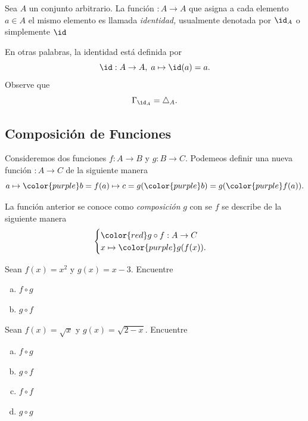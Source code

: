 	\begin{problema}
		Sea $A$ un conjunto arbitrario. La función $:A \to A$ que asigna a cada elemento $a\in A$ el mismo elemento es llamada \emph{identidad,} usualmente denotada por $\id_{A}$ o simplemente $\id$
		
		
		En otras palabras, la identidad está definida por $$
		\id:A\to A, \; a \mapsto \id(a)=a.
		$$ Observe que
		$$
		\Gamma_{\id_{A}}=\triangle_{A}.
		$$
	\end{problema}
	


% 
% 
% 
% 
% 
% 
% 

\subsection{Composición de Funciones}


	Consideremos dos funciones $f:A \to B$ y $g:B \to C.$ Podemeos definir una nueva función $:A \to C$ de la siguiente manera
	$$
	a \mapsto {\color{purple}b=f(a)} \mapsto c=g({\color{purple}b})=g({\color{purple}f(a)}).
	$$
	
	
	La función anterior se conoce como \emph{composición} $g$ con se $f$ se describe de la siguiente manera
	$$
	\begin{cases} 
		{\color{red} g\circ f}:A\to C \\ 
		x \mapsto {\color{purple}g(f(x))}.
	\end{cases}
	$$




\begin{problema}
Sean $f(x)=x^{2}$ y $g(x)=x-3.$ Encuentre 
\begin{enumerate}[(a)]
\item $f\circ g$ 
\item $g\circ f$
\end{enumerate}
\end{problema}




\begin{problema}
Sean $f(x)=\sqrt{x}$ y $g(x)=\sqrt{2-x}.$ Encuentre 
\begin{enumerate}[(a)]
\item $f\circ g$ 
\item $g\circ f$ 
\item $f\circ f$ 
\item $g\circ g$
\end{enumerate}

\end{problema}


